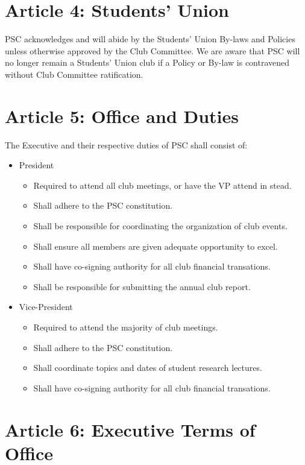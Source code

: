 \documentclass{article}
\begin{document}
\section{Article 4: Students' Union}

PSC acknowledges and will abide by the Students' Union By-laws and Policies unless otherwise approved by the Club Committee.
We are aware that PSC will no longer remain a Students' Union club if a Policy or By-law is contravened without Club Committee ratification.

\section{Article 5: Office and Duties}

The Executive and their respective duties of PSC shall consist of:
\begin{itemize}
    \item President
        \begin{itemize}
            \item Required to attend all club meetings, or have the VP attend in stead.
            \item Shall adhere to the PSC constitution.
            \item Shall be responsible for coordinating the organization of club events.
            \item Shall ensure all members are given adequate opportunity to excel.
            \item Shall have co-signing authority for all club financial transations.
            \item Shall be responsible for submitting the annual club report.
        \end{itemize}
    \item Vice-President
        \begin{itemize}
            \item Required to attend the majority of club meetings.
            \item Shall adhere to the PSC constitution.
            \item Shall coordinate topics and dates of student research lectures.
            \item Shall have co-signing authority for all club financial transations.
        \end{itemize}
\end{itemize}

\section{Article 6: Executive Terms of Office}
\end{document}
